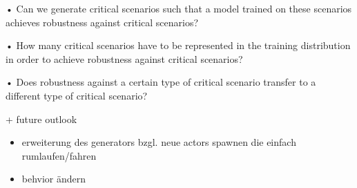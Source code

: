 \documentclass[conference, 11pt]{IEEEtran}
\begin{document}
• Can we generate critical scenarios such that a model trained
on these scenarios achieves robustness against critical
scenarios?

• How many critical scenarios have to be represented in the
training distribution in order to achieve robustness against
critical scenarios?

• Does robustness against a certain type of critical scenario
transfer to a different type of critical scenario?

+ future outlook

\begin{itemize}
	\item erweiterung des generators bzgl. neue actors spawnen die einfach rumlaufen/fahren
	\item behvior ändern
\end{itemize}

\printbibliography
\end{document}
